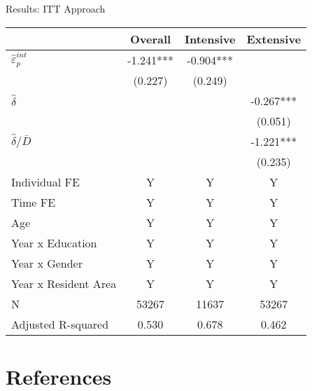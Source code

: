 \documentclass[
  ignorenonframetext,
  aspectratio=169,
]{beamer}
\begin{document}
\begin{frame}{Results: ITT Approach}
\protect\hypertarget{results-itt-approach}{}
\begin{table}
\centering\begingroup\fontsize{9}{11}\selectfont

\begin{tabular}{lccc}
\toprule
 & Overall & Intensive & Extensive\\
\midrule
$\hat{\varepsilon}_p^{int}$ & -1.241*** & -0.904*** & \\
 & (0.227) & (0.249) & \\
$\hat{\delta}$ &  &  & -0.267***\\
 &  &  & (0.051)\\
$\hat{\delta}/\bar{D}$ &  &  & -1.221***\\
 &  &  & (0.235)\\
Individual FE & Y & Y & Y\\
Time FE & Y & Y & Y\\
Age & Y & Y & Y\\
Year x Education & Y & Y & Y\\
Year x Gender & Y & Y & Y\\
Year x Resident Area & Y & Y & Y\\
N & 53267 & 11637 & 53267\\
Adjusted R-squared & 0.530 & 0.678 & 0.462\\
\bottomrule
\end{tabular}
\endgroup{}
\end{table}

\clearpage
\end{frame}

\hypertarget{references}{%
\section*{References}\label{references}}
\end{document}
